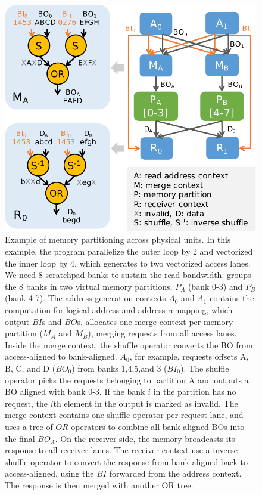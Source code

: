 \begin{figure}
  \centering
  \includegraphics[width=0.6\columnwidth]{figs/memsplit2.pdf}
  \caption[Memory partitioning]{Example of memory partitioning across physical units. In this
  example, the program parallelize the outer loop by 2 and vectorized the inner loop by 4, which
  generates to two vectorized access lanes. We need 8 scratchpad banks to sustain the read bandwidth. 
  \name groups the 8 banks in two virtual memory partitions, $P_A$ (bank 0-3) and $P_B$ (bank 4-7). The
  address generation contexts $A_0$ and $A_1$ contains the computation for logical address and address
  remapping, which output $BI$s and $BO$s. \name allocates one merge context per memory partition
  ($M_A$ and $M_B$),
  merging requests from all access lanes. Inside the merge context, the shuffle operator converts
  the BO from access-aligned to bank-aligned. $A_0$, for example, requests offsets 
  A, B, C, and D ($BO_0$) from banks 1,4,5,and 3 ($BI_0$). The shuffle operator picks the requests
  belonging to partition A and outputs a BO aligned with bank 0-3. If the bank $i$ in the partition has no
  request, the $i$th element in the output is marked as invalid.
  The merge context contains one shuffle operator per request lane, and uses a tree of $OR$
  operators to combine all bank-aligned BOs into the final $BO_A$.
  On the receiver side, the memory broadcasts its response to all receiver lanes.
  The receiver context use a inverse shuffle operator to convert the response from bank-aligned back to
  access-aligned, using the $BI$ forwarded from the address context. The response is then merged
  with another OR tree. 
  }
  \label{fig:memsplit}
\end{figure}


